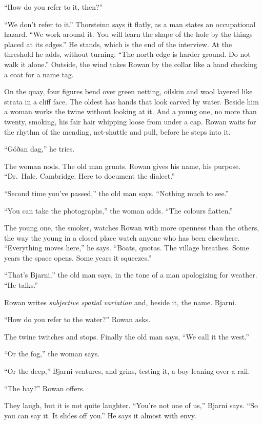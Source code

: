 \documentclass[11pt,oneside]{book}
\newcommand{\sceneline}{%
  \par\vspace{1.2em}
  \begin{center}
    \fontsize{11}{11}\selectfont \textbullet\quad\textbullet\quad\textbullet
  \end{center}
  \vspace{0.6em}\noindent\ignorespaces
}
\begin{document}
``How do you refer to it, then?''

``We don't refer to it.'' Thorsteinn says it flatly, as a man states an
occupational hazard. ``We work around it. You will learn the shape of
the hole by the things placed at its edges.'' He stands, which is the
end of the interview. At the threshold he adds, without turning: ``The
north edge is harder ground. Do not walk it alone.'' Outside, the wind
takes Rowan by the collar like a hand checking a coat for a name tag.

\sceneline

On the quay, four figures bend over green netting, oilskin and wool
layered like strata in a cliff face. The oldest has hands that look
carved by water. Beside him a woman works the twine without looking at
it. And a young one, no more than twenty, smoking, his fair hair
whipping loose from under a cap. Rowan waits for the rhythm of the
mending, net-shuttle and pull, before he steps into it.

``Góðan dag,'' he tries.

The woman nods. The old man grunts. Rowan gives his name, his purpose.
``Dr.~Hale. Cambridge. Here to document the dialect.''

``Second time you've passed,'' the old man says. ``Nothing much to
see.''

``You can take the photographs,'' the woman adds. ``The colours
flatten.''

The young one, the smoker, watches Rowan with more openness than the
others, the way the young in a closed place watch anyone who has been
elsewhere. ``Everything moves here,'' he says. ``Boats, quotas. The
village breathes. Some years the space opens. Some years it squeezes.''

``That's Bjarni,'' the old man says, in the tone of a man apologizing
for weather. ``He talks.''

Rowan writes \emph{subjective spatial variation} and, beside it, the
name. Bjarni.

``How do you refer to the water?'' Rowan asks.

The twine twitches and stops. Finally the old man says, ``We call it the
west.''

``Or the fog,'' the woman says.

``Or the deep,'' Bjarni ventures, and grins, testing it, a boy leaning
over a rail.

``The bay?'' Rowan offers.

They laugh, but it is not quite laughter. ``You're not one of us,''
Bjarni says. ``So you can say it. It slides off you.'' He says it almost
with envy.
\end{document}
